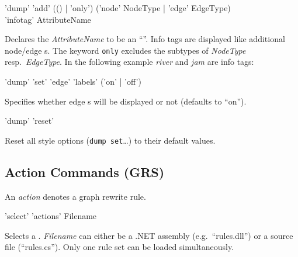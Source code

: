 \begin{rail}
  'dump' 'add' (() | 'only') ('node' NodeType | 'edge' EdgeType) \\ 'infotag' AttributeName
\end{rail}
Declares the  \emph{AttributeName} to be an ``''. Info tags are displayed like additional node/edge s. The keyword \texttt{only} excludes the subtypes of \emph{NodeType} resp.\ \emph{EdgeType}. In the following example \emph{river} and \emph{jam} are info tags:
\begin{center}
\end{center}


\begin{rail}
  'dump' 'set' 'edge' 'labels' ('on' | 'off')
\end{rail}
Specifies whether edge s will be displayed or not (defaults to ``on'').

\begin{rail}
  'dump' 'reset'
\end{rail}
Reset all style options (\texttt{dump set}\dots) to their default values.

\subsection{Action Commands (GRS)}
\label{grsthings}
An \emph{action} denotes a graph rewrite rule.

\begin{rail}
  'select' 'actions' Filename
\end{rail}
Selects a . \emph{Filename} can either be a .NET assembly (e.g.\ ``rules.dll'') or a source file (``rules.cs''). Only one rule set can be loaded simultaneously.

